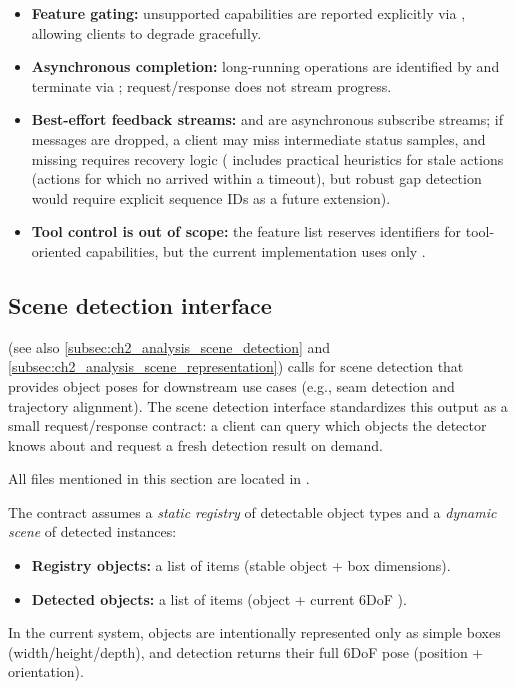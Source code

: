 \begin{itemize}
    \item \textbf{Feature gating:} unsupported capabilities are reported explicitly via , allowing clients to degrade gracefully.
    \item \textbf{Asynchronous completion:} long-running operations are identified by  and terminate via ; request/response does not stream progress.
    \item \textbf{Best-effort feedback streams:}  and  are asynchronous subscribe streams; if messages are dropped, a client may miss intermediate status samples, and missing  requires recovery logic ( includes practical heuristics for stale actions (actions for which no  arrived within a timeout), but robust gap detection would require explicit sequence IDs as a future extension).
    \item \textbf{Tool control is out of scope:} the feature list reserves identifiers for tool-oriented capabilities, but the current implementation uses only .
\end{itemize}





\subsection{Scene detection interface} \label{sec:ch3_scene_detection_interface}

 (see also \autoref{subsec:ch2_analysis_scene_detection} and \autoref{subsec:ch2_analysis_scene_representation}) calls for scene detection that provides object poses for downstream use cases (e.g., seam detection and trajectory alignment). The scene detection interface standardizes this output as a small request/response contract: a client can query which objects the detector knows about and request a fresh detection result on demand.

All files mentioned in this section are located in .

The contract assumes a \emph{static registry} of detectable object types and a \emph{dynamic scene} of detected instances:
\begin{itemize}
    \item \textbf{Registry objects:} a list of  items (stable object  + box dimensions).
    \item \textbf{Detected objects:} a list of  items (object  + current 6DoF ).
\end{itemize}
In the current system, objects are intentionally represented only as simple boxes (width/height/depth), and detection returns their full 6DoF pose (position + orientation).


